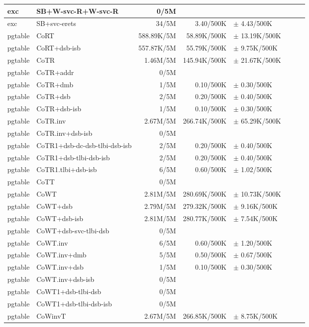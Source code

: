 \begin{tabular}{l l  | r r l | r r l}
\hline
   exc&SB+W-svc-R+W-svc-R&0/5M&&&\\
\hline
   exc&SB+svc-erets&34/5M&3.40/500K&$\pm$ 4.43/500K&\\
\hline
   pgtable&CoRT&588.89K/5M&58.89K/500K&$\pm$ 13.19K/500K&\\
\hline
   pgtable&CoRT+dsb-isb&557.87K/5M&55.79K/500K&$\pm$ 9.75K/500K&\\
\hline
   pgtable&CoTR&1.46M/5M&145.94K/500K&$\pm$ 21.67K/500K&\\
\hline
   pgtable&CoTR+addr&0/5M&&&\\
\hline
   pgtable&CoTR+dmb&1/5M&0.10/500K&$\pm$ 0.30/500K&\\
\hline
   pgtable&CoTR+dsb&2/5M&0.20/500K&$\pm$ 0.40/500K&\\
\hline
   pgtable&CoTR+dsb-isb&1/5M&0.10/500K&$\pm$ 0.30/500K&\\
\hline
   pgtable&CoTR.inv&2.67M/5M&266.74K/500K&$\pm$ 65.29K/500K&\\
\hline
   pgtable&CoTR.inv+dsb-isb&0/5M&&&\\
\hline
   pgtable&CoTR1+dsb-dc-dsb-tlbi-dsb-isb&2/5M&0.20/500K&$\pm$ 0.40/500K&\\
\hline
   pgtable&CoTR1+dsb-tlbi-dsb-isb&2/5M&0.20/500K&$\pm$ 0.40/500K&\\
\hline
   pgtable&CoTR1.tlbi+dsb-isb&6/5M&0.60/500K&$\pm$ 1.02/500K&\\
\hline
   pgtable&CoTT&0/5M&&&\\
\hline
   pgtable&CoWT&2.81M/5M&280.69K/500K&$\pm$ 10.73K/500K&\\
\hline
   pgtable&CoWT+dsb&2.79M/5M&279.32K/500K&$\pm$ 9.16K/500K&\\
\hline
   pgtable&CoWT+dsb-isb&2.81M/5M&280.77K/500K&$\pm$ 7.54K/500K&\\
\hline
   pgtable&CoWT+dsb-svc-tlbi-dsb&0/5M&&&\\
\hline
   pgtable&CoWT.inv&6/5M&0.60/500K&$\pm$ 1.20/500K&\\
\hline
   pgtable&CoWT.inv+dmb&5/5M&0.50/500K&$\pm$ 0.67/500K&\\
\hline
   pgtable&CoWT.inv+dsb&1/5M&0.10/500K&$\pm$ 0.30/500K&\\
\hline
   pgtable&CoWT.inv+dsb-isb&0/5M&&&\\
\hline
   pgtable&CoWT1+dsb-tlbi-dsb&0/5M&&&\\
\hline
   pgtable&CoWT1+dsb-tlbi-dsb-isb&0/5M&&&\\
\hline
   pgtable&CoWinvT&2.67M/5M&266.85K/500K&$\pm$ 8.75K/500K&\\

\end{tabular}
